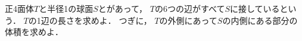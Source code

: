 \documentclass[../../main.tex]{subfiles}
\begin{document}
正4面体$T$と半径1の球面$S$とがあって，
$T$の6つの辺がすべて$S$に接しているという．
$T$の1辺の長さを求めよ．
つぎに，
$T$の外側にあって$S$の内側にある部分の体積を求めよ．
\end{document}
